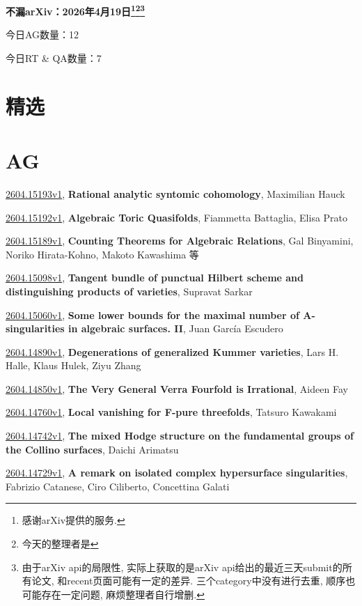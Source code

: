 \documentclass[9pt, a4paper]{article}
\theoremstyle{plain}
\theoremstyle{definition}
\theoremstyle{remark}
\newcommand{\arxiv}[3]{\href{https://arxiv.org/abs/#1}{#1}, \textbf{\textcolor{arxivblue}{#2}}, #3}
\newcommand{\AGnumber}{12}
\newcommand{\RTQAnumber}{7}
\newcommand{\NewestDate}{2026年4月19日}
\newcommand{\todayarXiver}{} %
\begin{document}
\begin{center}
    \Huge\textbf{不漏arXiv：\NewestDate\footnote{感谢arXiv提供的服务.}\footnote{今天的整理者是\todayarXiver}\footnote{由于arXiv api的局限性, 实际上获取的是arXiv api给出的最近三天submit的所有论文, 和recent页面可能有一定的差异. 三个category中没有进行去重, 顺序也可能存在一定问题, 麻烦整理者自行增删.}} \\
\end{center}

\setcounter{section}{-1}

\begin{center}
    今日AG数量：\AGnumber
    
    今日RT \& QA数量：\RTQAnumber
    
\end{center}


\section{精选}


\section{AG}
\arxiv{2604.15193v1}{Rational analytic syntomic cohomology}{Maximilian Hauck}

\arxiv{2604.15192v1}{Algebraic Toric Quasifolds}{Fiammetta Battaglia, Elisa Prato}

\arxiv{2604.15189v1}{Counting Theorems for Algebraic Relations}{Gal Binyamini, Noriko Hirata-Kohno, Makoto Kawashima 等}

\arxiv{2604.15098v1}{Tangent bundle of punctual Hilbert scheme and distinguishing products of varieties}{Supravat Sarkar}

\arxiv{2604.15060v1}{Some lower bounds for the maximal number of A-singularities in algebraic surfaces. II}{Juan García Escudero}

\arxiv{2604.14890v1}{Degenerations of generalized Kummer varieties}{Lars H. Halle, Klaus Hulek, Ziyu Zhang}

\arxiv{2604.14850v1}{The Very General Verra Fourfold is Irrational}{Aideen Fay}

\arxiv{2604.14760v1}{Local vanishing for F-pure threefolds}{Tatsuro Kawakami}

\arxiv{2604.14742v1}{The mixed Hodge structure on the fundamental groups of the Collino surfaces}{Daichi Arimatsu}

\arxiv{2604.14729v1}{A remark on isolated complex hypersurface singularities}{Fabrizio Catanese, Ciro Ciliberto, Concettina Galati}
\end{document}
